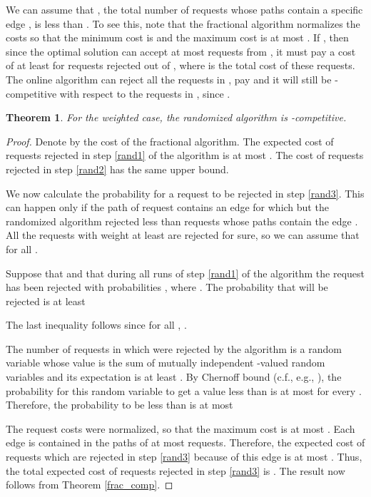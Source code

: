 \documentclass{sig-alternate}
\newtheorem{theorem}{Theorem}\newtheorem{prop}[theorem]{Proposition}
\begin{document}
We can assume that , the total number of requests whose
paths contain a specific edge , is less than . To see
this, note that the fractional algorithm normalizes the costs so
that the minimum cost is  and the maximum cost is at most
. If , then since the optimal solution
can accept at most  requests from , it must pay a cost
of at least  for requests rejected out of , where
 is the total cost of these requests. The online algorithm can
reject all the requests in , pay  and it will still be
-competitive with respect to the requests in , since .

\begin{theorem}\label{rand_comp}
For the weighted case, the randomized algorithm is -competitive.
\end{theorem}

\begin{proof}
Denote by  the cost of the fractional algorithm. The
expected cost of requests rejected in step \ref{rand1} of the
algorithm is at most . The cost of requests
rejected in step \ref{rand2} has the same upper bound.

We now calculate the probability for a request  to be rejected
in step \ref{rand3}. This can happen only if the path of request
 contains an edge  for which  but the randomized algorithm rejected less than 
requests whose paths contain the edge . All the requests with
weight at least  are rejected for sure,
so we can assume that  for all .

Suppose that  and that during all runs of step
\ref{rand1} of the algorithm the request  has been rejected
with probabilities , where . The probability that  will be rejected is at
least

The last inequality follows since for all ,
.

The number of requests in  which were rejected by the
algorithm is a random variable whose value is the sum of mutually
independent -valued random variables and its expectation
is at least . By Chernoff bound (c.f., e.g.,
\cite{AS00}), the probability for this random variable to get a
value less than  is at most  for
every . Therefore, the probability to be less than  is
at most

The request costs were normalized, so that the maximum cost is at
most . Each edge is contained in the paths of at most 
requests. Therefore, the expected cost of requests which are
rejected in step \ref{rand3} because of this edge is at most
. Thus, the total expected cost
of requests rejected in step \ref{rand3} is . The result now
follows from Theorem \ref{frac_comp}.

\end{proof}
\end{document}
